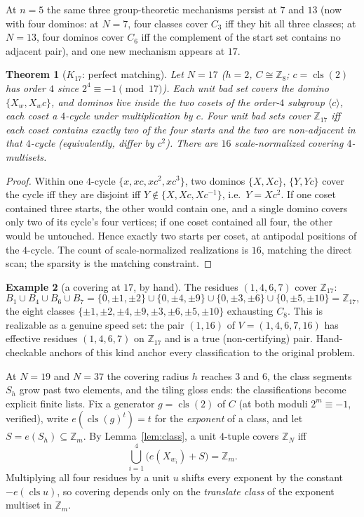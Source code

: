 \documentclass[11pt,a4paper]{article}
\numberwithin{equation}{section}
\theoremstyle{plain}
\newtheorem{theorem}{Theorem}[section]
\theoremstyle{definition}
\newtheorem{example}[theorem]{Example}
\theoremstyle{remark}
\newcommand{\Z}{\mathbb{Z}}
\DeclareMathOperator{\cls}{cls}
\begin{document}
At $n=5$ the same three group-theoretic mechanisms persist at
$7$ and $13$ (now with four dominos: at $N=7$, four classes cover
$C_3$ iff they hit all three classes; at $N=13$, four dominos cover
$C_6$ iff the complement of the start set contains no adjacent pair), and
one new mechanism appears at $17$.

\begin{theorem}[$K_{17}$: perfect matching]\label{thm:K17}
Let $N=17$ ($h=2$, $C\cong\Z_8$; $c=\cls(2)$ has order $4$ since
$2^4\equiv-1 \pmod{17}$). Each unit bad set covers the domino
$\{X_w,X_wc\}$, and dominos live inside the two cosets of the order-$4$
subgroup $\langle c\rangle$, each coset a $4$-cycle under multiplication
by $c$. Four unit bad sets cover $\Z_{17}$ iff each coset contains
exactly two of the four starts and the two are non-adjacent in that
$4$-cycle (equivalently, differ by $c^2$). There are $16$
scale-normalized covering $4$-multisets.
\end{theorem}

\begin{proof}
Within one $4$-cycle $\{x,xc,xc^2,xc^3\}$, two dominos
$\{X,Xc\}$, $\{Y,Yc\}$ cover the cycle iff they are disjoint iff
$Y\notin\{X,Xc,Xc^{-1}\}$, i.e.\ $Y=Xc^2$. If one coset contained three
starts, the other would contain one, and a single domino covers only two
of its cycle's four vertices; if one coset contained all four, the other
would be untouched. Hence exactly two starts per coset, at antipodal
positions of the $4$-cycle. The count of scale-normalized realizations is
$16$, matching the direct scan; the sparsity is the matching constraint.
\end{proof}

\begin{example}[a covering at $17$, by hand]\label{ex:17}
The residues $(1,4,6,7)$ cover $\Z_{17}$:
\[
B_1\cup B_4\cup B_6\cup B_7
=\{0,\pm1,\pm2\}\cup\{0,\pm4,\pm9\}\cup\{0,\pm3,\pm6\}
 \cup\{0,\pm5,\pm10\}=\Z_{17},
\]
the eight classes $\{\pm1,\pm2,\pm4,\pm9,\pm3,\pm6,\pm5,\pm10\}$
exhausting $C_8$. This is realizable as a genuine speed set: the pair
$(1,16)$ of $V=(1,4,6,7,16)$ has effective residues $(1,4,6,7)$ on
$\Z_{17}$ and is a true (non-certifying) pair. Hand-checkable anchors of
this kind anchor every classification to the original problem.
\end{example}

At $N=19$ and $N=37$ the covering radius $h$ reaches $3$ and $6$, the
class segments $S_h$ grow past two elements, and the tiling gloss ends:
the classifications become explicit finite lists. Fix a generator
$g=\cls(2)$ of $C$ (at both moduli $2^{m}\equiv -1$, verified), write
$e(\cls(g)^t)=t$ for the \emph{exponent} of a class, and let
$S=e(S_h)\subseteq\Z_m$. By Lemma~\ref{lem:class}, a unit $4$-tuple
covers $\Z_N$ iff
\[
\bigcup_{i=1}^{4}\bigl(e(X_{w_i})+S\bigr)=\Z_m .
\]
Multiplying all four residues by a unit $u$ shifts every exponent by the
constant $-e(\cls u)$, so covering depends only on the \emph{translate
class} of the exponent multiset in $\Z_m$.
\end{document}
